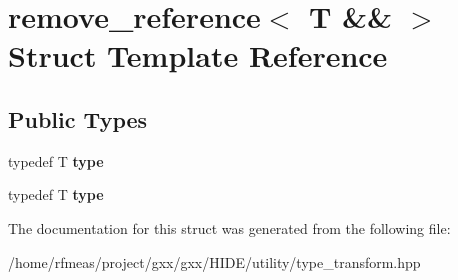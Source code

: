 \hypertarget{structremove__reference_3_01T_01_6_6_01_4}{}\section{remove\+\_\+reference$<$ T \&\& $>$ Struct Template Reference}
\label{structremove__reference_3_01T_01_6_6_01_4}
\subsection*{Public Types}
\begin{DoxyCompactItemize}
\item 
typedef T {\bfseries type}\hypertarget{structremove__reference_3_01T_01_6_6_01_4_a4f3cfde5cdd501c6c28bf650548c8dec}{}\label{structremove__reference_3_01T_01_6_6_01_4_a4f3cfde5cdd501c6c28bf650548c8dec}

\item 
typedef T {\bfseries type}\hypertarget{structremove__reference_3_01T_01_6_6_01_4_a4f3cfde5cdd501c6c28bf650548c8dec}{}\label{structremove__reference_3_01T_01_6_6_01_4_a4f3cfde5cdd501c6c28bf650548c8dec}

\end{DoxyCompactItemize}


The documentation for this struct was generated from the following file\+:\begin{DoxyCompactItemize}
\item 
/home/rfmeas/project/gxx/gxx/\+H\+I\+D\+E/utility/type\+\_\+transform.\+hpp\end{DoxyCompactItemize}
